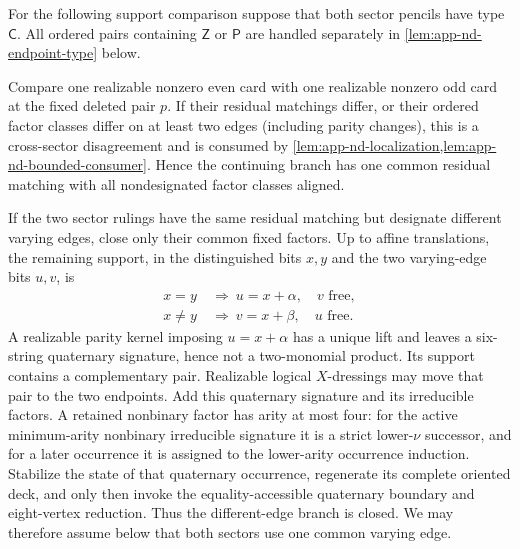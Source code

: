 \documentclass[11pt,letterpaper,onecolumn]{article}
\theoremstyle{plain}
\theoremstyle{definition}
\theoremstyle{remark}
\begin{document}
For the following support comparison suppose that both sector
pencils have type \(\mathsf{C}\). All ordered pairs containing \(\mathsf Z\) or \(\mathsf P\) are
handled separately in \cref{lem:app-nd-endpoint-type} below.

Compare one realizable nonzero even card with one realizable nonzero odd card at the fixed
deleted pair \(p\).  If their residual matchings differ, or their ordered factor classes differ
on at least two edges (including parity changes), this is a cross-sector
disagreement and is consumed
by \cref{lem:app-nd-localization,lem:app-nd-bounded-consumer}.  Hence the
continuing branch has one common residual matching with all nondesignated
factor classes aligned.

If the two sector rulings have the same residual matching but designate
different varying edges, close only their common fixed factors.  Up to affine
translations, the remaining support, in the distinguished bits \(x,y\) and
the two varying-edge bits \(u,v\), is
\begin{equation*}
  \begin{aligned}
    x=y&\ \Longrightarrow\ u=x+\alpha,\quad v\text{ free},\\
    x\ne y&\ \Longrightarrow\ v=x+\beta,\quad u\text{ free}.
  \end{aligned}
\end{equation*}
A realizable parity kernel imposing \(u=x+\alpha\) has a unique lift and leaves
a six-string quaternary signature, hence not a two-monomial product.  Its
support contains a complementary pair. Realizable logical \(X\)-dressings
may move that pair to the two endpoints.  Add this quaternary signature and
its irreducible factors.  A retained nonbinary factor has arity at
most four: for the active minimum-arity nonbinary irreducible signature it is a strict lower-\(\nu\)
successor, and for a later occurrence it is assigned to the lower-arity
occurrence induction.  Stabilize the state of that quaternary occurrence, regenerate its complete
oriented deck, and only then invoke the equality-accessible quaternary
boundary and eight-vertex reduction.  Thus the different-edge branch is closed.
We may therefore assume below that both sectors use one common varying
edge.
\end{document}
